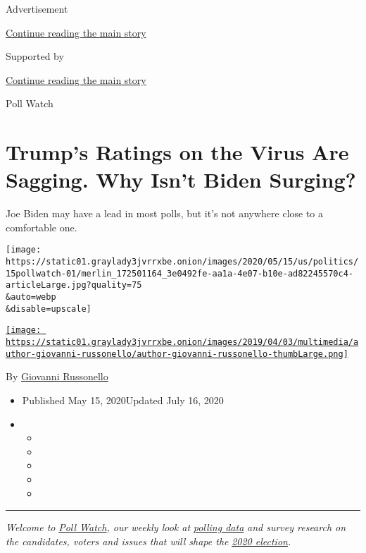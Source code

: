Advertisement

\protect\hyperlink{after-top}{Continue reading the main story}

Supported by

\protect\hyperlink{after-sponsor}{Continue reading the main story}

Poll Watch

\hypertarget{trumps-ratings-on-the-virus-are-sagging-why-isnt-biden-surging}{%
\section{Trump's Ratings on the Virus Are Sagging. Why Isn't Biden
Surging?}\label{trumps-ratings-on-the-virus-are-sagging-why-isnt-biden-surging}}

Joe Biden may have a lead in most polls, but it's not anywhere close to
a comfortable one.

\texttt{[image: https://static01.graylady3jvrrxbe.onion/images/2020/05/15/us/politics/15pollwatch-01/merlin\_172501164\_3e0492fe-aa1a-4e07-b10e-ad82245570c4-articleLarge.jpg?quality=75\\\&auto=webp\\\&disable=upscale]}

\href{https://www.nytimes3xbfgragh.onion/by/giovanni-russonello}{\texttt{[image: https://static01.graylady3jvrrxbe.onion/images/2019/04/03/multimedia/author-giovanni-russonello/author-giovanni-russonello-thumbLarge.png]}}

By
\href{https://www.nytimes3xbfgragh.onion/by/giovanni-russonello}{Giovanni
Russonello}

\begin{itemize}
\item
  Published May 15, 2020Updated July 16, 2020
\item
  \begin{itemize}
  \item
  \item
  \item
  \item
  \item
  \end{itemize}
\end{itemize}

\begin{center}\rule{0.5\linewidth}{\linethickness}\end{center}

\emph{Welcome to}
\href{https://www.nytimes3xbfgragh.onion/column/poll-watch}{\emph{Poll
Watch}}\emph{, our weekly look at}
\href{https://www.nytimes3xbfgragh.onion/interactive/2020/us/elections/democratic-polls.html}{\emph{polling
data}} \emph{and survey research on the candidates, voters and issues
that will shape the}
\href{https://www.nytimes3xbfgragh.onion/news-event/2020-election}{\emph{2020
election}}\emph{.}


